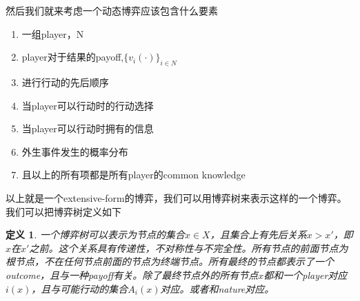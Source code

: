 \documentclass[UTF8,12pt]{ctexart}
\newtheorem{Def}{定义}[section]
\numberwithin{equation}{section} %
\numberwithin{figure}{section}
\numberwithin{table}{section}
\begin{document}
	然后我们就来考虑一个动态博弈应该包含什么要素
	\begin{enumerate}
		\item 一组player，N
		
		\item player对于结果的payoff,$\{v_i(\cdot)\}_{i \in N}$
		
		\item 进行行动的先后顺序
		
		\item 当player可以行动时的行动选择
		
		\item 当player可以行动时拥有的信息
		
		\item 外生事件发生的概率分布
		
		\item 且以上的所有项都是所有player的common knowledge
	\end{enumerate}
	以上就是一个extensive-form的博弈，我们可以用博弈树来表示这样的一个博弈。我们可以把博弈树定义如下
	\begin{Def}
		一个博弈树可以表示为节点的集合$x \in X$，且集合上有先后关系$x > x'$，即$x$在$x'$之前。这个关系具有传递性，不对称性与不完全性。所有节点的前面节点为根节点，不在任何节点前面的节点为终端节点。所有最终的节点都表示了一个outcome，且与一种payoff有关。除了最终节点外的所有节点$x$都和一个player对应$i(x)$，且与可能行动的集合$A_i(x)$对应。或者和nature对应。
	\end{Def}
	
\end{document}
